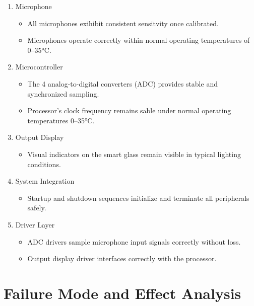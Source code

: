 \documentclass{article}
\begin{document}
\begin{enumerate}
    \item Microphone
    \begin{itemize}
        \item All microphones exihibit consistent sensitvity  once calibrated. 
        \item Microphones operate correctly within normal operating temperatures of 0–35°C. 
    \end{itemize}
    
    \item Microcontroller
    \begin{itemize}
        \item The 4 analog-to-digital converters (ADC) provides stable and synchronized sampling. 
        \item Processor's clock frequency remains sable under normal operating temperatures 0–35°C. 
    \end{itemize}

    \item Output Display
    \begin{itemize}
        \item Visual indicators on the smart glass remain visible in typical lighting conditions. 
    \end{itemize}

    \item System Integration
    \begin{itemize}
        \item Startup and shutdown sequences initialize and terminate all peripherals safely. 
    \end{itemize}

    \item Driver Layer
    \begin{itemize}
        \item ADC drivers sample microphone input signals correctly without loss. 
        \item Output display driver interfaces correctly with the processor. 
    \end{itemize}
\end{enumerate}



\section{Failure Mode and Effect Analysis}
\end{document}
